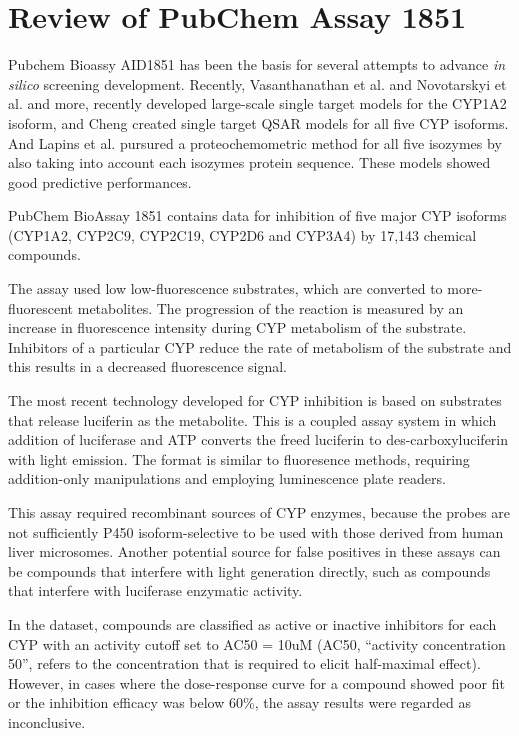 \section{Review of PubChem Assay 1851}


Pubchem Bioassy AID1851 has been the basis for several attempts to advance \textit{in silico} screening development. Recently, Vasanthanathan et al. and Novotarskyi et al. and more, recently developed large-scale single target models for the CYP1A2 isoform, and Cheng created single target QSAR models for all five CYP isoforms.\cite{Vasanthanathan2012, Novotarskyi2012, Cheng2012} And Lapins et al. pursured a proteochemometric method for all five isozymes by also taking into account each isozymes protein sequence. \cite{Lapins2013} These models showed good predictive performances.


PubChem BioAssay 1851 contains data for inhibition of five major CYP isoforms (CYP1A2, CYP2C9, CYP2C19, CYP2D6 and CYP3A4) by 17,143 chemical compounds. \cite{Veith2009}

The assay used low low-fluorescence substrates, which are converted to more-fluorescent metabolites. The progression of the reaction is measured by an increase in fluorescence intensity during CYP metabolism of the substrate. Inhibitors of a particular CYP reduce the rate of metabolism of the substrate and this results in a decreased fluorescence signal. \cite{Zlokarnik2005}

The most recent technology developed for CYP inhibition is based on substrates that release luciferin as the metabolite. This is a coupled assay system in which addition of luciferase and ATP converts the freed luciferin to des-carboxyluciferin with light emission. The format is similar to fluoresence methods, requiring addition-only manipulations and employing luminescence plate readers. \cite{Zlokarnik2005}

This assay required recombinant sources of CYP enzymes, because the probes are not sufficiently P450 isoform-selective to be used with those derived from human liver microsomes. Another potential source for false positives in these assays can be compounds that interfere with light generation directly, such as compounds that interfere with luciferase enzymatic activity. \cite{Zlokarnik2005}


In the dataset, compounds are classified as active or inactive inhibitors for each CYP with an activity cutoff set to AC50 = 10uM (AC50, “activity concentration 50”, refers to the concentration that is required to elicit half-maximal effect). However, in cases where the dose-response curve for a compound showed poor fit or the inhibition efficacy was below 60\%, the assay results were regarded as inconclusive.\cite{Lapins2013}

